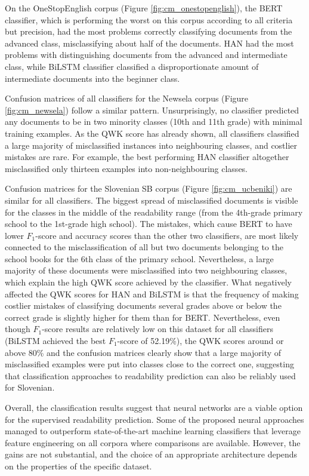 \documentclass{clv3}
\begin{document}
On the OneStopEnglish corpus (Figure \ref{fig:cm_onestopenglish}), the BERT classifier, which is performing the worst on this corpus according to all criteria but precision, had the most problems correctly classifying documents from the advanced class, misclassifying about half of the documents. HAN had the most problems with distinguishing documents from the advanced and intermediate class, while BiLSTM classifier classified a disproportionate amount of intermediate documents into the beginner class.

Confusion matrices of all classifiers for the Newsela corpus (Figure \ref{fig:cm_newsela}) follow a similar pattern. Unsurprisingly, no classifier predicted any documents to be in two minority classes (10th and 11th grade) with minimal training examples. As the QWK score has already shown, all classifiers classified a large majority of misclassified instances into neighbouring classes, and costlier mistakes are rare. For example, the best performing HAN classifier altogether misclassified only thirteen examples into non-neighbouring classes.

Confusion matrices for the Slovenian SB corpus (Figure \ref{fig:cm_ucbeniki}) are  similar for all classifiers. The biggest spread of misclassified documents is visible for the classes in the middle of the readability range (from the 4th-grade primary school to the 1st-grade high school). The mistakes, which cause BERT to have lower $F_1$-score and accuracy scores than the other two classifiers, are most likely connected to the misclassification of all but two documents belonging to the school books for the 6th class of the primary school. Nevertheless, a large majority of these documents were misclassified into two neighbouring classes, which explain the high QWK score achieved by the classifier. What negatively affected the QWK scores for HAN and BiLSTM is that the frequency of making costlier mistakes of classifying documents several grades above or below the correct grade is slightly higher for them than for BERT. Nevertheless, even though $F_1$-score results are relatively low on this dataset for all classifiers (BiLSTM achieved the best $F_1$-score of 52.19\%), the QWK scores around or above 80\% and the confusion matrices clearly show that a large majority of misclassified examples were put into classes close to the correct one, suggesting that classification approaches to readability prediction can also be reliably used for Slovenian.

Overall, the classification results suggest that neural networks are a viable option for the supervised readability prediction. Some of the proposed neural approaches managed to outperform state-of-the-art machine learning classifiers that leverage feature engineering \citep{xia2016text, vajjala2018onestopenglish, deutsch2020linguistic} on all corpora where comparisons are available. However, the gains are not substantial, and the choice of an appropriate architecture depends on the properties of the specific dataset.    
\end{document}
